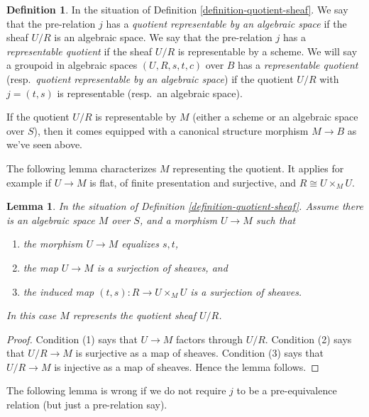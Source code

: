 \documentclass{stacks-project}
\theoremstyle{plain}
\newtheorem{lemma}[subsection]{Lemma}
\theoremstyle{definition}
\newtheorem{definition}[subsection]{Definition}
\theoremstyle{remark}
\numberwithin{equation}{subsection}
\begin{document}
\begin{definition}
\label{definition-representable-quotient}
In the situation of Definition \ref{definition-quotient-sheaf}.
We say that the pre-relation $j$ has a
{\it quotient representable by an algebraic space}
if the sheaf $U/R$ is an algebraic space.
We say that the pre-relation $j$ has a
{\it representable quotient}
if the sheaf $U/R$ is representable by a scheme.
We will say a groupoid in algebraic spaces $(U, R, s, t, c)$ over $B$ has a
{\it representable quotient}
(resp.\ {\it quotient representable by an algebraic space})
if the quotient $U/R$ with $j = (t, s)$ is representable (resp.\ an
algebraic space).
\end{definition}

\noindent
If the quotient $U/R$ is representable by $M$ (either a scheme or an algebraic
space over $S$), then it comes equipped with a canonical structure morphism
$M \to B$ as we've seen above.

\medskip\noindent
The following lemma characterizes $M$ representing the quotient.
It applies for example if $U \to M$ is flat,
of finite presentation and surjective, and $R \cong U \times_M U$.

\begin{lemma}
\label{lemma-criterion-quotient-representable}
In the situation of Definition \ref{definition-quotient-sheaf}.
Assume there is an algebraic space $M$ over $S$,
and a morphism $U \to M$ such that
\begin{enumerate}
\item the morphism $U \to M$ equalizes $s, t$,
\item the map $U \to M$ is a surjection of sheaves, and
\item the induced map $(t, s) : R \to U \times_M U$ is a
surjection of sheaves.
\end{enumerate}
In this case $M$ represents the quotient sheaf $U/R$.
\end{lemma}

\begin{proof}
Condition (1) says that $U \to M$ factors through $U/R$.
Condition (2) says that $U/R \to M$ is surjective as a map of sheaves.
Condition (3) says that $U/R \to M$ is injective as a map of sheaves.
Hence the lemma follows.
\end{proof}

\noindent
The following lemma is wrong if we do not require $j$ to be a
pre-equivalence relation (but just a pre-relation say).
\end{document}
